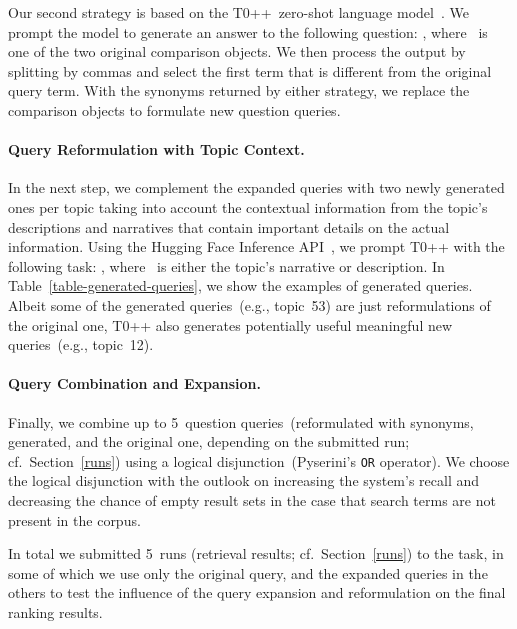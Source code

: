 Our second strategy is based on the T0++~zero-shot language model~\cite{SanhWRBSACSLRDBXTSSKCNDCJWMSYPBWNRSSFFTBGBWR2021}.
We prompt the model to generate an answer to the following question: , where ~is one of the two original comparison objects.
We then process the output by splitting by commas and select the first term that is different from the original query term.
With the synonyms returned by either strategy, we replace the comparison objects to formulate new question queries.

\paragraph{Query Reformulation with Topic Context.}


In the next step, we complement the expanded queries with two newly generated ones per topic taking into account the contextual information from the topic's descriptions and narratives that
contain important details on the actual information.
Using the Hugging Face Inference API~\cite{WolfDSCDMCRLFDSPMJPXSGDLR2020}, we prompt T0++ with the following task: , where ~is either the topic's narrative or description.
In Table~\ref{table-generated-queries}, we show the examples of generated queries.
Albeit some of the generated queries~(e.g., topic~53) are just reformulations of the original one, T0++ also generates potentially useful meaningful new queries~(e.g., topic~12).

\paragraph{Query Combination and Expansion.}

Finally, we combine up to 5~question queries~(reformulated with synonyms, generated, and the original one, depending on the submitted run; cf.\ Section~\ref{runs}) using a logical disjunction~(Pyserini's \texttt{OR} operator).
We choose the logical disjunction with the outlook on increasing the system's recall and decreasing the chance of empty result sets in the case that search terms are not present in the corpus.

In total we submitted 5~runs (retrieval results;  cf.\ Section~\ref{runs}) to the task, in some of which we use only the original query, and the expanded queries in the others to test the influence of the query expansion and reformulation on the final ranking results.

